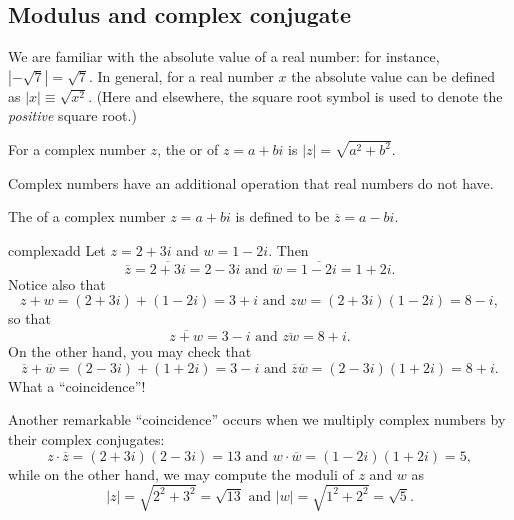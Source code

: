 \subsection{Modulus and complex conjugate}

We are familiar with the absolute value of a real number: for instance,
$|-\sqrt{7}|=\sqrt{7}$. In general, for a real number $x$ the absolute
value can be defined as $|x|\equiv\sqrt{x^{2}}$. (Here and elsewhere, the square root symbol is used to denote the \emph{positive} square root.)

\begin{defn}
For a complex number $z$, the  or 
of $z=a+bi$ is $|z|=\sqrt{a^{2}+b^{2}}$.
\end{defn}

Complex numbers have an additional operation that real numbers do
not have. 

\begin{defn}
The 
of a complex number $z=a+bi$ is defined to be $\overline{z}=a-bi$.
\end{defn}

\begin{example}{complexadd} Let $z=2+3i$ and $w=1-2i$. Then 
\[ \overline{z} = \overline{2+3i} = 2 - 3i \text{   and   } \overline{w} = \overline{1 - 2i} = 1 + 2i.\]
Notice also that 
\[ z+w=(2+3i)+(1-2i)=3+i \text{  and  } zw=(2+3i)(1-2i)=8-i,\]
so that 
\[ \overline{z+w}=3-i \text{  and  } \overline{zw}=8+i.\]
On the other hand, you may check  that 
\[ \overline{z}+\overline{w}=(2-3i)+(1+2i)=3-i \text{  and  } \overline{z}\overline{w}=(2-3i)(1+2i)=8+i.\]
What a ``coincidence''!

Another remarkable ``coincidence'' occurs when we multiply complex numbers by their complex conjugates:
\[ z \cdot \overline{z} = (2+3i)(2-3i) = 13 \text{  and  }  w \cdot \overline{w} = (1-2i)(1+2i) = 5, \]
while on the other hand, we may compute the moduli of $z$ and $w$ as
\[ |z| = \sqrt{2^2 + 3^2} = \sqrt{13} \text{  and  } |w| = \sqrt{ 1^2 + 2^2} =\sqrt{5}. \]
 \end{example}
 \medskip

